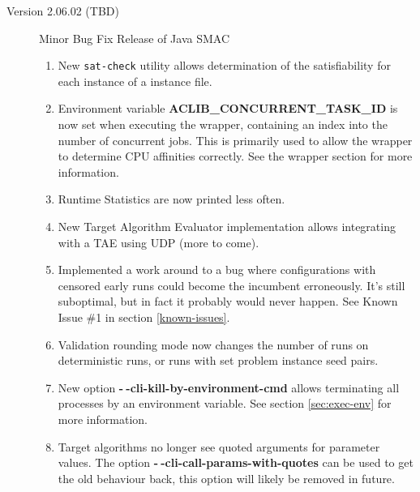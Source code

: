 \documentclass[11pt,letterpaper,oneside]{article}
\begin{document}
\begin{description}
          \item[Version 2.06.02 (TBD)] Minor Bug Fix Release of Java SMAC
          	\begin{enumerate}
          	\item New \texttt{sat-check} utility allows determination of the satisfiability for each instance of a instance file.
          		\item Environment variable \textbf{ACLIB\_CONCURRENT\_TASK\_ID} is now set when executing the wrapper, containing an index into the number of concurrent jobs. This is primarily used to allow the wrapper to determine CPU affinities correctly. See the wrapper section for more information.
          		\item Runtime Statistics are now printed less often.
          		\item New Target Algorithm Evaluator implementation allows integrating with a TAE using UDP (more to come).
          		\item Implemented a work around to a bug where configurations with censored early runs could become the incumbent erroneously. It's still suboptimal, but in fact it probably would never happen. See Known Issue \#1 in section \ref{known-issues}.
          		\item Validation rounding mode now changes the number of runs on deterministic runs, or runs with set problem instance seed pairs.
          		\item New option \textbf{-$~\!\!$-cli-kill-by-environment-cmd} allows terminating all processes by an environment variable. See section \ref{sec:exec-env} for more information.
          		\item Target algorithms no longer see quoted arguments for parameter values. The option \textbf{-$~\!\!$-cli-call-params-with-quotes} can be used to get the old behaviour back, this option will likely be removed in future.
          	\end{enumerate}
          	

	\end{description}
\end{document}
